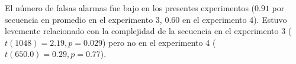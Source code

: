 
El número de falsas alarmas fue bajo en los presentes experimentos ($0.91$ por secuencia en promedio en el experimento 3, $0.60$ en el experimento 4). Estuvo levemente relacionado con la complejidad de la secuencia en el experimento 3 ($t (1048) = 2.19, p = 0.029$) pero no en el experimento 4 ($t (650.0) = 0.29, p = 0.77$).

